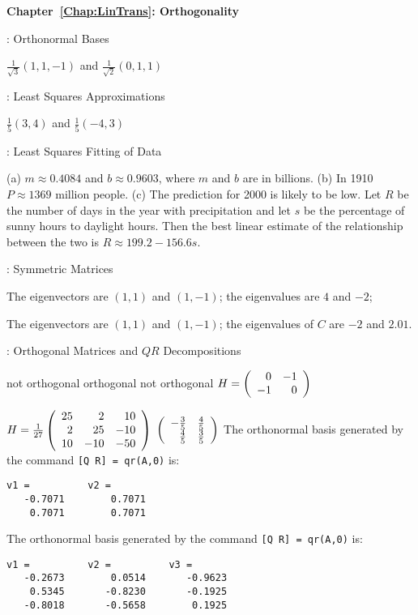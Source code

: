 \vspace{0.08in}
{\bf Chapter~\ref{Chap:LinTrans}: Orthogonality}

: Orthonormal Bases

\ans  $\frac{1}{\sqrt{3}}(1,1,-1)$ and $\frac{1}{\sqrt{2}}(0,1,1)$

: Least Squares Approximations

\ans $\frac{1}{5}(3,4)$ and $\frac{1}{5}(-4,3)$


: Least Squares Fitting of Data

(a) \ans $m \approx 0.4084$ and $b \approx 0.9603$, where $m$ and $b$ are in
billions.
(b) In 1910 $P \approx 1369$ million people.
(c) \ans The prediction for 2000 is likely to be low.
\ans Let $R$ be the number of days in the year with precipitation and
let $s$ be the percentage of sunny hours to daylight hours.  Then the
best linear estimate of the relationship between the two is $R \approx 199.2 -156.6s$. 


: Symmetric Matrices

\ans The eigenvectors are $(1,1)$ and $(1,-1)$; the eigenvalues are $4$ and 
$-2$; 

\ans The eigenvectors are $(1,1)$ and $(1,-1)$;
the eigenvalues of $C$ are $-2$ and $2.01$.



: Orthogonal Matrices and $QR$ Decompositions

 \ans not orthogonal
 orthogonal
 not orthogonal
 $H = \left(\begin{array}{rr} 0 & -1\\ -1 &0\end{array}\right)$

$H = \frac{1}{27}\left(\begin{array}{rrr} 25 & 2 & 10 \\ 2 & 25 & -10 \\ 10 & -10 & -50\end{array}\right)$
\ans $\left(\begin{array}{rr} -\frac{3}{5} & \frac{4}{5}\\ \frac{4}{5} &\frac{3}{5}\end{array}\right)$
 The orthonormal basis generated by the command {\tt [Q R] = qr(A,0)} is:
\begin{verbatim}
v1 =          v2 =
   -0.7071        0.7071
    0.7071        0.7071
\end{verbatim}

The orthonormal basis generated by the command {\tt [Q R] = qr(A,0)} is:
\begin{verbatim}
v1 =          v2 =          v3 = 
   -0.2673        0.0514       -0.9623
    0.5345       -0.8230       -0.1925
   -0.8018       -0.5658        0.1925
\end{verbatim}

